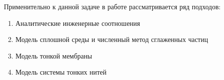 Применительно к данной задаче в работе рассматривается ряд подходов:

\begin{enumerate}
    \item Аналитические инженерные соотношения
    \item Модель сплошной среды и численный метод сглаженных частиц
    \item Модель тонкой мембраны
    \item Модель системы тонких нитей
\end{enumerate}
